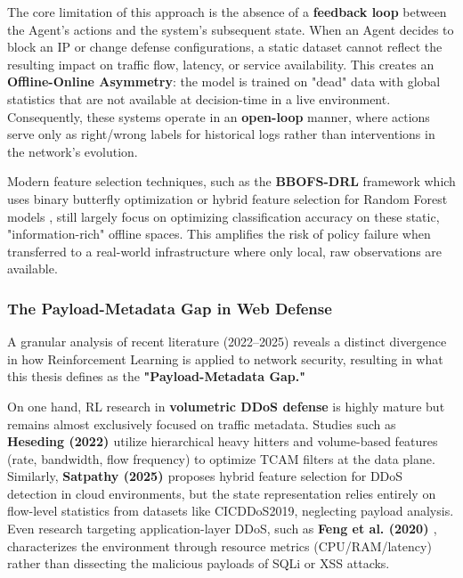 \documentclass[12pt,a4paper]{report}
\begin{document}
The core limitation of this approach is the absence of a \textbf{feedback loop} between the Agent's actions and the system's subsequent state. When an Agent decides to block an IP or change defense configurations, a static dataset cannot reflect the resulting impact on traffic flow, latency, or service availability. This creates an \textbf{Offline-Online Asymmetry}: the model is trained on "dead" data with global statistics that are not available at decision-time in a live environment. Consequently, these systems operate in an \textbf{open-loop} manner, where actions serve only as right/wrong labels for historical logs rather than interventions in the network's evolution.

Modern feature selection techniques, such as the \textbf{BBOFS-DRL} framework which uses binary butterfly optimization \cite{zhang2023bbofs} or hybrid feature selection for Random Forest models \cite{sahu2022hybrid}, still largely focus on optimizing classification accuracy on these static, "information-rich" offline spaces. This amplifies the risk of policy failure when transferred to a real-world infrastructure where only local, raw observations are available.

\subsubsection*{The Payload-Metadata Gap in Web Defense}

A granular analysis of recent literature (2022--2025) reveals a distinct divergence in how Reinforcement Learning is applied to network security, resulting in what this thesis defines as the \textbf{"Payload-Metadata Gap."}

On one hand, RL research in \textbf{volumetric DDoS defense} is highly mature but remains almost exclusively focused on traffic metadata. Studies such as \textbf{Heseding (2022) \cite{heseding2022reinforcement}} utilize hierarchical heavy hitters and volume-based features (rate, bandwidth, flow frequency) to optimize TCAM filters at the data plane. Similarly, \textbf{Satpathy (2025) \cite{satpathy2025cloud}} proposes hybrid feature selection for DDoS detection in cloud environments, but the state representation relies entirely on flow-level statistics from datasets like CICDDoS2019, neglecting payload analysis. Even research targeting application-layer DDoS, such as \textbf{Feng et al. (2020) \cite{feng2020application}}, characterizes the environment through resource metrics (CPU/RAM/latency) rather than dissecting the malicious payloads of SQLi or XSS attacks.
\end{document}
